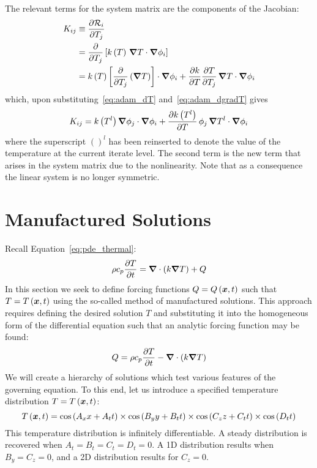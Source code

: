 The relevant terms for the system matrix are the components of the Jacobian:
\begin{align}
  K_{ij} & \equiv {\frac{\partial{\mathcal{R}_i}}{\partial{T_j}}} \\
        &= {\frac{\partial{}}{\partial{T_j}}}\left[k\left(T\right)\,{\boldsymbol{\nabla}} {T}\cdot{\boldsymbol{\nabla}} {\phi}_i\right] \\
        &= k\left(T\right) \left[{\frac{\partial{}}{\partial{T_j}}}\left({\boldsymbol{\nabla}} {T}\right)\right] \cdot{\boldsymbol{\nabla}} {\phi}_i +
           {\frac{\partial{k}}{\partial{T}}}{\frac{\partial{T}}{\partial{T_j}}} \,{\boldsymbol{\nabla}} {T}\cdot{\boldsymbol{\nabla}} {\phi}_i           
\end{align}
which, upon substituting~\eqref{eq:adam_dT} and~\eqref{eq:adam_dgradT} gives 
\begin{equation}
  K_{ij} = k\left(T^l\right) {\boldsymbol{\nabla}} {\phi}_j\cdot{\boldsymbol{\nabla}} {\phi}_i +
           {\frac{\partial{k\left(T^l\right)}}{\partial{T}}}\,\phi_j\,{\boldsymbol{\nabla}} {T}^l\cdot{\boldsymbol{\nabla}} {\phi}_i
\end{equation}
where the superscript $()^l$ has been reinserted to denote the value of the temperature at the current iterate level.  The second term is the new term that arises in the system matrix due to the nonlinearity.  Note that as a consequence the linear system is no longer symmetric.


\section{Manufactured Solutions}
Recall Equation~\eqref{eq:pde_thermal}:
\begin{equation*}
  \rho c_p {\frac{\partial{T}}{\partial{t}}} = {\boldsymbol{\nabla}} {}\cdot\left(k {\boldsymbol{\nabla}} {T}\right) + Q
\end{equation*}
In this section we seek to define forcing functions $Q=Q\left({\boldsymbol{x}},t\right)$ such that $T=T\left({\boldsymbol{x}},t\right)$ using the so-called method of manufactured solutions.  This approach requires defining the desired solution $T$ and substituting it into the homogeneous form of the differential equation such that an analytic forcing function may be found:
\begin{equation}
  Q = \rho c_p {\frac{\partial{T}}{\partial{t}}} - {\boldsymbol{\nabla}} {}\cdot\left(k {\boldsymbol{\nabla}} {T}\right)
  \label{eq:thermal_mms}
\end{equation}
We will create a hierarchy of solutions which test various features of the governing equation.  To this end, let us introduce a specified temperature distribution $T=T\left({\boldsymbol{x}},t\right)$:
\begin{equation}
  T\left({\boldsymbol{x}},t\right) = \cos\left(A_x x + A_t t\right)\times\cos\left(B_y y + B_t t\right)\times\cos\left(C_z z + C_t t\right)\times \cos\left(D_t t\right)
\end{equation}
This temperature distribution is infinitely differentiable.  A steady distribution is recovered when $A_t=B_t=C_t=D_t=0$.  A 1D distribution results when $B_y=C_z=0$, and a 2D distribution results for $C_z=0$.

